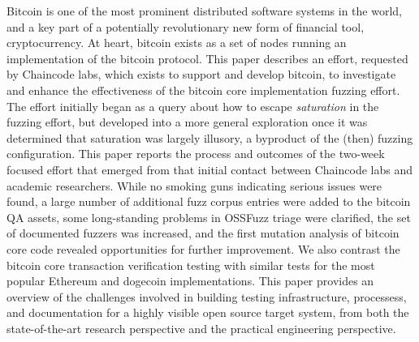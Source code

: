 Bitcoin is one of the most prominent distributed software systems in the world, and a key part of a potentially revolutionary new form of financial tool, cryptocurrency.  At heart, bitcoin exists as a set of nodes running an implementation of the bitcoin protocol.  This paper describes an effort, requested by Chaincode labs, which exists to support and develop bitcoin, to investigate and enhance the effectiveness of the bitcoin core implementation fuzzing effort.  The effort initially began as a query about how to escape \emph{saturation} in the fuzzing effort, but developed into a more general exploration once it was determined that saturation was largely illusory, a byproduct of the (then) fuzzing configuration.  This paper reports the process and outcomes of the two-week focused effort that emerged from that initial contact between Chaincode labs and academic researchers.  While no smoking guns indicating serious issues were found, a large number of additional fuzz corpus entries were added to the bitcoin QA assets, some long-standing problems in OSSFuzz triage were clarified, the set of documented fuzzers was increased, and the first mutation analysis of bitcoin core code revealed opportunities for further improvement.  We also contrast the bitcoin core transaction verification testing with similar tests for the most popular Ethereum and dogecoin implementations.  This paper provides an overview of the challenges involved in building testing infrastructure, processess, and documentation for a highly visible open source target system, from both the state-of-the-art research perspective and the practical engineering perspective.